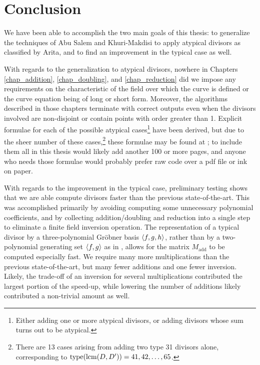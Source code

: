 
\section{Conclusion}
\label{chap_conclusion}

We have been able to accomplish the two main goals of this thesis:
to generalize the techniques of Abu Salem and Khuri-Makdisi to apply atypical divisors as classified by Arita,
and to find an improvement in the typical case as well.

With regards to the generalization to atypical divisors,
nowhere in Chapters \ref{chap_addition}, \ref{chap_doubling}, and \ref{chap_reduction}
did we impose any requirements on the characteristic of the field over which the curve is defined
or the curve equation being of long or short form.
Moreover, the algorithms described in those chapters terminate with correct outputs
even when the divisors involved are non-disjoint or contain points with order greater than 1.
Explicit formulae for each of the possible atypical cases\footnote{
Either adding one or more atypical divisors, or adding divisors whose sum turns out to be atypical.}
have been derived, but due to the sheer number of these cases,\footnote{
There are 13 cases arising from adding two type 31 divisors alone,
corresponding to $\operatorname{type}(\operatorname{lcm}(D, D')) = 41, 42, \ldots, 65$.}
these formulae may be found at \cite{github};
to include them all in this thesis would likely add another 100 or more pages,
and anyone who needs those formulae would probably prefer raw code over a pdf file or ink on paper.

With regards to the improvement in the typical case,
preliminary testing shows that we are able compute divisors faster than the previous state-of-the-art.
This was accomplished primarily by avoiding computing some unnecessary polynomial coefficients,
and by collecting addition/doubling and reduction into a single step to eliminate a finite field inversion operation.
The representation of a typical divisor by a three-polynomial Gr\"obner basis $\left\langle f,g,h \right\rangle$,
rather than by a two-polynomial generating set $\left\langle f,g \right\rangle$ as in \cite{salem07},
allows for the matrix $M_{\text{add}}$ to be computed especially fast.
We require many more multiplications than the previous state-of-the-art,
but many fewer additions and one fewer inversion.
Likely, the trade-off of an inversion for several multiplications contributed the largest portion of the speed-up,
while lowering the number of additions likely contributed a non-trivial amount as well.

